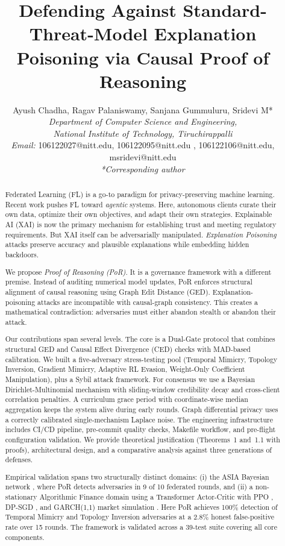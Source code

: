 \documentclass[journal]{IEEEtran}
\title{Defending Against Standard-Threat-Model Explanation Poisoning via Causal Proof of Reasoning}
\author{Ayush Chadha, Ragav Palaniswamy, Sanjana Gummuluru, Sridevi M*\\
\vspace{0.2cm}\textit{Department of Computer Science and Engineering,}\\
\vspace{0.2cm}\textit{National Institute of Technology, Tiruchirappalli}\\[0.3cm]
\textit{Email:} 106122027@nitt.edu, 106122095@nitt.edu , 106122106@nitt.edu, msridevi@nitt.edu\\[0.1cm]
\textit{*Corresponding author}
}
\begin{document}
\maketitle

\begin{abstract}
Federated Learning (FL) is a go-to paradigm for privacy-preserving machine learning. Recent work pushes FL toward \emph{agentic} systems. Here, autonomous clients curate their own data, optimize their own objectives, and adapt their own strategies. Explainable AI (XAI) is now the primary mechanism for establishing trust and meeting regulatory requirements. But XAI itself can be adversarially manipulated. \emph{Explanation Poisoning} attacks preserve accuracy and plausible explanations while embedding hidden backdoors.

We propose \emph{Proof of Reasoning (PoR)}. It is a governance framework with a different premise. Instead of auditing numerical model updates, PoR enforces structural alignment of causal reasoning using Graph Edit Distance (GED). Explanation-poisoning attacks are incompatible with causal-graph consistency. This creates a mathematical contradiction: adversaries must either abandon stealth or abandon their attack.

Our contributions span several levels. The core is a Dual-Gate protocol that combines structural GED and Causal Effect Divergence (CED) checks with MAD-based calibration. We built a five-adversary stress-testing pool (Temporal Mimicry, Topology Inversion, Gradient Mimicry, Adaptive RL Evasion, Weight-Only Coefficient Manipulation), plus a Sybil attack framework. For consensus we use a Bayesian Dirichlet-Multinomial mechanism with sliding-window credibility decay and cross-client correlation penalties. A curriculum grace period with coordinate-wise median aggregation keeps the system alive during early rounds. Graph differential privacy uses a correctly calibrated single-mechanism Laplace noise. The engineering infrastructure includes CI/CD pipeline, pre-commit quality checks, Makefile workflow, and pre-flight configuration validation. We provide theoretical justification (Theorems~1 and~1.1 with proofs), architectural design, and a comparative analysis against three generations of defenses.

Empirical validation spans two structurally distinct domains: (i) the ASIA Bayesian network \cite{lauritzen1988}, where PoR detects adversaries in 9 of 10 federated rounds, and (ii) a non-stationary Algorithmic Finance domain using a Transformer Actor-Critic \cite{vaswani2017} with PPO \cite{schulman2017}, DP-SGD \cite{abadi2016}, and GARCH(1,1) market simulation \cite{bollerslev1986}. Here PoR achieves 100\% detection of Temporal Mimicry and Topology Inversion adversaries at a 2.8\% honest false-positive rate over 15 rounds. The framework is validated across a 39-test suite covering all core components. \end{abstract}
\end{document}
